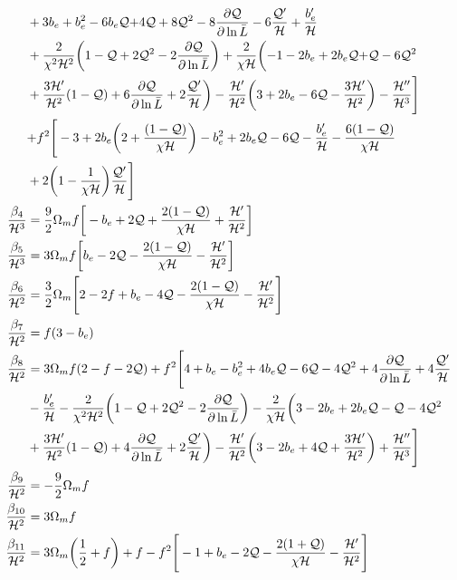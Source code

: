 \begin{align}
& +{3}b_{e}+b_{e}^{2}-6b_{e}\Q{+4}\Q +8\Q^{2}-8\frac{\p \Q}{\p \ln{\bar{L}}} -6\frac{\Q'}{\cH} +\frac{b_{e}'}{\cH} \nonumber \\
& +\frac{2}{\chi^{2}\cH^{2}}\bigg(1-\Q+2\Q^{2}-2\frac{\p \Q}{\p \ln{\bar{L}}}\bigg) + \frac{2}{\chi \cH}\bigg({-1} -2b_{e}+2b_{e}\Q{+}\Q-6\Q^{2}  \nonumber \\
& +\frac{3\cH'}{\cH^{2}}(1-\Q) +6\frac{\p \Q}{\p \ln{\bar{L}}} + 2\frac{\Q'}{\cH}\bigg) -\frac{\cH'}{\cH^{2}}\bigg({3}+2b_{e}-6\Q-\frac{3\cH'}{\cH^{2}}\bigg) - \frac{\cH''}{\cH^{3}}\Bigg] \nonumber \\
&  {+} f^{2}\Bigg[-3+2b_{e}\bigg(2+\frac{(1-\Q)}{\chi\cH}\bigg)-b_{e}^{2}+2b_{e}\Q -6\Q-\frac{b_{e}'}{\cH}-\frac{6(1-\Q)}{\chi\cH}\nonumber \\
& +2\bigg(1-\frac{1}{\chi\cH}\bigg)\frac{\Q'}{\cH}\Bigg]  \\ 
\frac{\beta_{4}}{\cH^{3}} &= \frac{9}{2}\Omega_{m}f\bigg[-b_{e}+2\Q+\frac{2(1-\Q)}{\chi \cH}+\frac{\cH'}{\cH^{2}}\bigg]\\ 
{{\frac{\beta_5}{\cH^{3}}}} &= 3\Omega_{m}f\bigg[b_{e}-2\Q-\frac{2(1-\Q)}{\chi\cH}-\frac{\cH'}{\cH^{2}}\bigg] \\ 
\frac{\beta_6}{\cH^{2}} &= \frac{3}{2}\Omega_{m}\Bigg[2-2f+b_{e}-4\Q-\frac{2(1-\Q)}{\chi\cH}-\frac{\cH'}{\cH^{2}}\Bigg] \\
\frac{\beta_7}{\cH^{2}} &= f(3-b_{e}) \\ 
\frac{\beta_8}{\cH^{2}} &= {3\Omega_{m}f(2-f-2\Q)} + f^{2}\Bigg[4+b_{e}-b_{e}^{2} + 4b_{e}\Q - {6}\Q - 4\Q^{2} + 4\frac{\p \Q}{\p \ln{\bar{L}}} + 4\frac{\Q'}{\cH} \nonumber \\
&- \frac{b_{e}'}{\cH} - \frac{2}{\chi^{2}\cH^{2}} \bigg( 1 - \Q + 2\Q^{2} - 2 \frac{\p \Q}{\p \ln{\bar{L}}}\bigg) - \frac{2}{\chi\cH}\bigg( 3 - 2 b_{e} + 2b_{e}\Q - \Q - 4\Q^{2} \nonumber \\
& + \frac{3\cH'}{\cH^{2}}(1-\Q) + 4\frac{\p \Q}{\p \ln{\bar{L}}} + 2\frac{\Q'}{\cH}\bigg) - \frac{\cH'}{\cH^{2}} \bigg( 3 - 2 b_{e} + {4} \Q + \frac{3\cH'}{\cH^{2}}\bigg) + \frac{\cH''}{\cH^{3}}\Bigg] \\ 
\frac{\beta_{9}}{\cH^{2}} &= -\frac{9}{2}\Omega_{m}f \\ 
{\frac{\beta_{10}}{\cH^{2}}} &= 3\Omega_{m}f \\ 
\frac{\beta_{11}}{\cH^{2}} &= 3\Omega_{m}\bigg(\frac{1}{2}+f\bigg) + f - f^{2}\Bigg[-1+b_{e}-2\Q- \frac{2(1+\Q)}{\chi\cH}-\frac{\cH'}{\cH^{2}}\Bigg] \\ 

\end{align}
